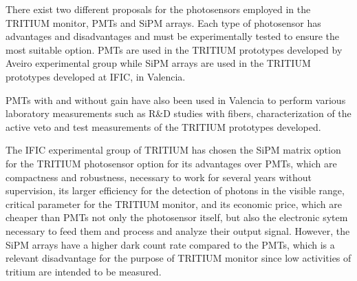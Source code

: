 There exist two different proposals for the photosensors employed in the TRITIUM monitor, PMTs and SiPM arrays. Each type of photosensor has advantages and disadvantages and must be experimentally tested to ensure the most suitable option. PMTs are used in the TRITIUM prototypes developed by Aveiro experimental group while SiPM arrays are used in the TRITIUM prototypes developed at IFIC, in Valencia.

PMTs with and without gain have also been used in Valencia to perform various laboratory measurements such as R\&D studies with fibers, characterization of the active veto and test measurements of the TRITIUM prototypes developed.

The IFIC experimental group of TRITIUM has chosen the SiPM matrix option for the TRITIUM photosensor option for its advantages over PMTs, which are compactness and robustness, necessary to work for several years without supervision, its larger efficiency for the detection of photons in the visible range, critical parameter for the TRITIUM monitor, and its economic price, which are cheaper than PMTs not only the photosensor itself, but also the electronic sytem necessary to feed them and process and analyze their output signal. However, the SiPM arrays have a higher dark count rate compared to the PMTs, which is a relevant disadvantage for the purpose of TRITIUM monitor since low activities of tritium are intended to be measured.
